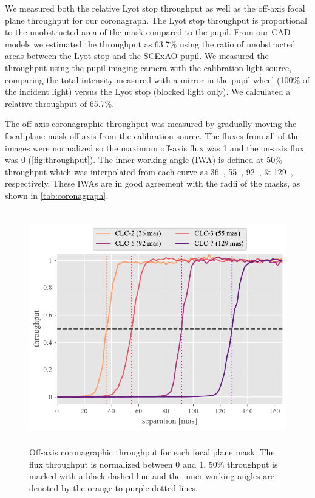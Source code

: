 \documentclass[]{spie}  %
\begin{document}
We measured both the relative Lyot stop throughput as well as the off-axis focal plane throughput for our coronagraph. The Lyot stop throughput is proportional to the unobstructed area of the mask compared to the pupil. From our CAD models we estimated the throughput as 63.7\% using the ratio of unobstructed areas between the Lyot stop and the SCExAO pupil. We measured the throughput using the pupil-imaging camera with the calibration light source, comparing the total intensity measured with a mirror in the pupil wheel (100\% of the incident light) versus the Lyot stop (blocked light only). We calculated a relative throughput of 65.7\%.

The off-axis coronagraphic throughput was measured by gradually moving the focal plane mask off-axis from the calibration source. The fluxes from all of the images were normalized so the maximum off-axis flux was 1 and the on-axis flux was 0 (\autoref{fig:throughput}). The inner working angle (IWA) is defined at 50\% throughput which was interpolated from each curve as \qtylist{36;55;92;129}{\milliarcsecond}, respectively. These IWAs are in good agreement with the radii of the masks, as shown in \autoref{tab:coronagraph}.


\begin{figure}
   \centering
   \includegraphics[height=4in]{figures/throughput_curves}
   \caption{Off-axis coronagraphic throughput for each focal plane mask. The flux throughput is normalized between 0 and 1. 50\% throughput is marked with a black dashed line and the inner working angles are denoted by the orange to purple dotted lines.}\label{fig:throughput}
\end{figure}
\end{document}
